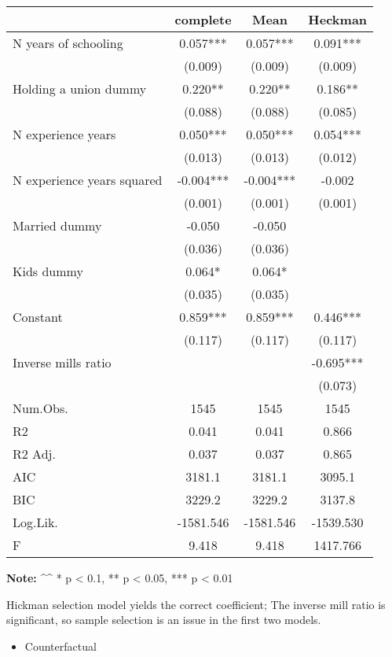 \documentclass[
]{article}
\providecommand{\tightlist}{%
  \setlength{\itemsep}{0pt}\setlength{\parskip}{0pt}}
\begin{document}
\begin{longtable}[]{@{}lccc@{}}
\toprule
& complete & Mean & Heckman \\
\midrule
\endhead
N years of schooling & 0.057*** & 0.057*** & 0.091*** \\
& (0.009) & (0.009) & (0.009) \\
Holding a union dummy & 0.220** & 0.220** & 0.186** \\
& (0.088) & (0.088) & (0.085) \\
N experience years & 0.050*** & 0.050*** & 0.054*** \\
& (0.013) & (0.013) & (0.012) \\
N experience years squared & -0.004*** & -0.004*** & -0.002 \\
& (0.001) & (0.001) & (0.001) \\
Married dummy & -0.050 & -0.050 & \\
& (0.036) & (0.036) & \\
Kids dummy & 0.064* & 0.064* & \\
& (0.035) & (0.035) & \\
Constant & 0.859*** & 0.859*** & 0.446*** \\
& (0.117) & (0.117) & (0.117) \\
Inverse mills ratio & & & -0.695*** \\
& & & (0.073) \\
Num.Obs. & 1545 & 1545 & 1545 \\
R2 & 0.041 & 0.041 & 0.866 \\
R2 Adj. & 0.037 & 0.037 & 0.865 \\
AIC & 3181.1 & 3181.1 & 3095.1 \\
BIC & 3229.2 & 3229.2 & 3137.8 \\
Log.Lik. & -1581.546 & -1581.546 & -1539.530 \\
F & 9.418 & 9.418 & 1417.766 \\
\bottomrule
\end{longtable}

\textbf{Note:} \^{}\^{} * p \textless{} 0.1, ** p \textless{} 0.05, ***
p \textless{} 0.01

Hickman selection model yields the correct coefficient; The inverse mill
ratio is significant, so sample selection is an issue in the first two
models.

\newpage

\begin{itemize}
\tightlist
\item
  Counterfactual
\end{itemize}
\end{document}
